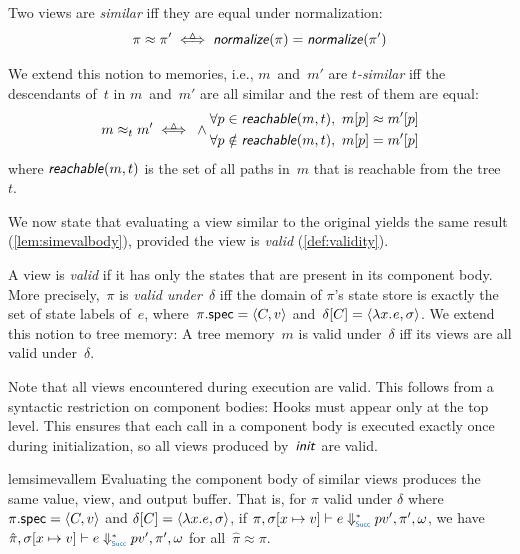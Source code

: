 \begin{defn}[Similarity]\label{def:similarity}
  Two views are \emph{similar} iff they are equal under normalization:
  \[
    \pi \approx \pi'
    \triangleiff
    \sem{normalize}(\pi) = \sem{normalize}(\pi')
  \]

  We extend this notion to memories, i.e., $m$~and~$m'$ are \emph{$t$-similar} iff the descendants of~$t$ in $m$~and~$m'$ are all similar and the rest of them are equal:
  \[
    m \approx_t m'
    \triangleiff
    {}\land \begin{lgathered}
      \forall p \in \sem{reachable}(m, t),\ m[p] \approx m'[p] \\
      \forall p \notin \sem{reachable}(m, t),\ m[p] = m'[p] \\
    \end{lgathered}
  \]
  where $\textsf{\textit{reachable}}(m, t)$ is the set of all paths in~$m$ that is reachable from the tree~$t$.
\end{defn}

We now state that evaluating a view similar to the original yields the same result (\cref{lem:simevalbody}), provided the view is \emph{valid} (\cref{def:validity}).

\begin{defn}[Validity]\label{def:validity}
  A view is \emph{valid} if it has only the states that are present in its component body.
  More precisely,~$\pi$ is \emph{valid under~$\delta$} iff the domain of $\pi$'s state store is exactly the set of state labels of~$e$, where~$\pi.\textup{\textsf{spec}} = \langle C, v\rangle$ and~$\delta[C] = \langle\lambda x.\mskip 1mue, \sigma\rangle$.
  We extend this notion to tree memory: A tree memory~$m$ is valid under~$\delta$ iff its views are all valid under~$\delta$.
\end{defn}

Note that all views encountered during execution are valid.
This follows from a syntactic restriction on component bodies: Hooks must appear only at the top level.
This ensures that each  call in a component body is executed exactly once during initialization,
so all views produced by~$\textsf{\textit{init}}$ are valid.

\begin{restatable}{lem}{simevallem}\label{lem:simevalbody}
  Evaluating the component body of similar views produces the same value, view, and output buffer.
  That is, for $\pi$ valid under $\delta$ where $\pi.\textup{\textsf{spec}} = \langle C,v\rangle$ and $\delta[C] = \langle\lambda x.e,\sigma\rangle$,
  if $\Step*<\phase{Succ}>[\pi,\sigma[x\mapsto v]]{e}{v',\pi', \omega}$,
  we have $\Step*<\phase{Succ}>[\hat \pi,\sigma[x\mapsto v]]{e}{v',\pi', \omega}$ for all~$\hat\pi \approx \pi$.
\end{restatable}

